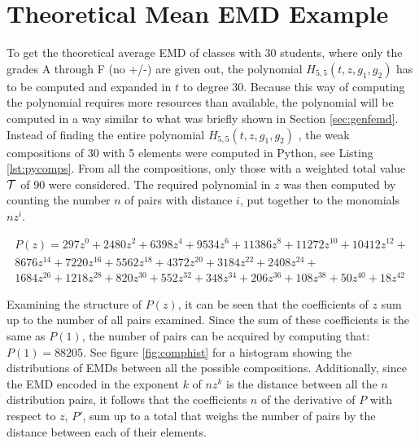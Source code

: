 \documentclass[12pt,letterpaper,oneside,openany]{book}
\begin{document}
\setcounter{section}{2}
\section{Theoretical Mean EMD Example}

To get the theoretical average EMD of classes with 30 students, where only the grades A through F  (no +/-) are given out, the polynomial $H_{5,5}(t, z, g_1, g_2)$ has to be computed and expanded in $t$ to degree 30. Because this way of computing the polynomial requires more resources than available, the polynomial will be computed in a way similar to what was briefly shown in Section \ref{sec:genfemd}.
Instead of finding the entire polynomial $H_{5,5}(t, z, g_1, g_2)$ , the weak compositions of 30 with 5 elements were computed in Python, see Listing \ref{lst:pycomps}. From all the compositions, only those with a weighted total value ${\mathcal{T}}$ of 90 were considered. The required polynomial in $z$ was then computed by counting the number $n$ of pairs with distance $i$, put together to the monomials $nz^i$.


\begin{multline*}
	P(z)=297z^{0}+2480z^{2}+6398z^{4}+9534z^{6}+11386z^{8}+11272z^{10}+10412z^{12}+\\8676z^{14}+7220z^{16}+5562z^{18}+4372z^{20}+3184z^{22}+2408z^{24}+\\1684z^{26}+1218z^{28}+820z^{30}+552z^{32}+348z^{34}+206z^{36}+108z^{38}+50z^{40}+18z^{42}
\end{multline*}

Examining the structure of $P(z)$, it can be seen that the coefficients of  $z$ sum up to the number of all pairs examined. Since the sum of these coefficients is the same as $P(1)$, the number of pairs can be acquired by computing that: $P(1)=88205$. See figure \ref{fig:comphist} for a histogram showing the distributions of EMDs between all the possible compositions.
Additionally, since the EMD encoded in the exponent $k$ of $nz^k$ is the distance between all the $n$ distribution pairs, it follows that the coefficients $n$ of the derivative of $P$ with respect to $z$, $P'$, sum up to a total that weighs the number of pairs by the distance between each of their elements.
\end{document}
